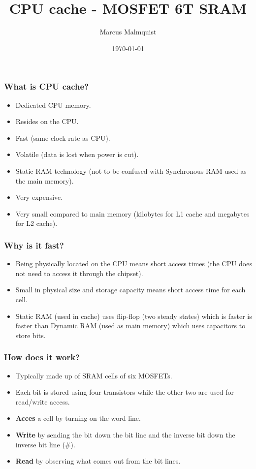 \documentclass{beamer}
\title[CPU cache - SRAM]{CPU cache - MOSFET 6T SRAM} %
\author{Marcus Malmquist} %
\institute[Chalmers] %
{
Chalmers University of Technology \\ %
\medskip
\textit{marmalm@student.chalmers.se} %
}
\date{\today} %
\begin{document}
\begin{frame}
\titlepage %
\end{frame}


\begin{frame}
  \frametitle{What is CPU cache?}
  \begin{itemize}
  \item Dedicated CPU memory.
  \item Resides on the CPU.
  \item Fast (same clock rate as CPU).
  \item Volatile (data is lost when power is cut).
  \item Static RAM technology (not to be confused with Synchronous RAM used as the main memory).
  \item Very expensive.
  \item Very small compared to main memory (kilobytes for L1 cache and megabytes for L2 cache).
  \end{itemize}
\end{frame}

\begin{frame}
  \frametitle{Why is it fast?}
  \begin{itemize}
  \item Being physically located on the CPU means short access times (the CPU does not need to access it through the chipset).
  \item Small in physical size and storage capacity means short access time for each cell.
  \item Static RAM (used in cache) uses flip-flop (two steady states) which is faster is faster than Dynamic RAM (used as main memory) which uses capacitors to store bits.
  \end{itemize}
\end{frame}

\begin{frame}
  \frametitle{How does it work?}
  \begin{itemize}
  \item Typically made up of SRAM cells of six MOSFETs.
  \item Each bit is stored using four transistors while the other two are used for read/write access.
  \item \textbf{Acces} a cell by turning on the word line.
  \item \textbf{Write} by sending the bit down the bit line and the inverse bit down the inverse bit line (\#).
  \item \textbf{Read} by observing what comes out from the bit lines.
  \end{itemize}
  \begin{figure}
    \noindent\makebox[\textwidth]{\scalebox{0.7}{}}
  \end{figure}
\end{frame}
\end{document}

